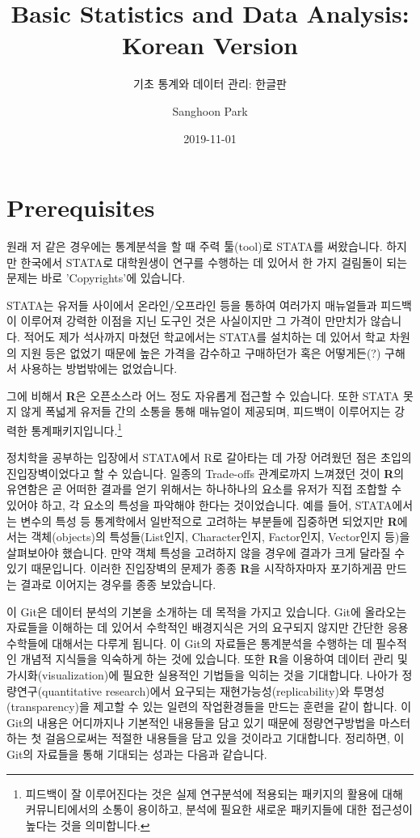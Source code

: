 \documentclass[]{book}
\title{Basic Statistics and Data Analysis: Korean Version}
\subtitle{기초 통계와 데이터 관리: 한글판}
\author{Sanghoon Park}
\date{2019-11-01}
\let\rmarkdownfootnote\footnote%
\def\footnote{\protect\rmarkdownfootnote}
\begin{document}
\maketitle

{
\hypersetup{linkcolor=black}
\setcounter{tocdepth}{1}
\tableofcontents
}
\hypertarget{prerequisites}{%
\chapter{Prerequisites}\label{prerequisites}}

원래 저 같은 경우에는 통계분석을 할 때 주력 툴(tool)로 STATA를 써왔습니다. 하지만 한국에서 STATA로 대학원생이 연구를 수행하는 데 있어서 한 가지 걸림돌이 되는 문제는 바로 'Copyrights'에 있습니다.

STATA는 유저들 사이에서 온라인/오프라인 등을 통하여 여러가지 매뉴얼들과 피드백이 이루어져 강력한 이점을 지닌 도구인 것은 사실이지만 그 가격이 만만치가 않습니다. 적어도 제가 석사까지 마쳤던 학교에서는 STATA를 설치하는 데 있어서 학교 차원의 지원 등은 없었기 때문에 높은 가격을 감수하고 구매하던가 혹은 어떻게든(?) 구해서 사용하는 방법밖에는 없었습니다.

그에 비해서 \textbf{R}은 오픈소스라 어느 정도 자유롭게 접근할 수 있습니다. 또한 STATA 못지 않게 폭넓게 유저들 간의 소통을 통해 매뉴얼이 제공되며, 피드백이 이루어지는 강력한 통계패키지입니다.\footnote{피드백이 잘 이루어진다는 것은 실제 연구분석에 적용되는 패키지의 활용에 대해 커뮤니티에서의 소통이 용이하고, 분석에 필요한 새로운 패키지들에 대한 접근성이 높다는 것을 의미합니다.}

정치학을 공부하는 입장에서 STATA에서 R로 갈아타는 데 가장 어려웠던 점은 초입의 진입장벽이었다고 할 수 있습니다. 일종의 Trade-offs 관계로까지 느껴졌던 것이 \textbf{R}의 유연함은 곧 어떠한 결과를 얻기 위해서는 하나하나의 요소를 유저가 직접 조합할 수 있어야 하고, 각 요소의 특성을 파악해야 한다는 것이었습니다. 예를 들어, STATA에서는 변수의 특성 등 통계학에서 일반적으로 고려하는 부분들에 집중하면 되었지만 \textbf{R}에서는 객체(objects)의 특성들(List인지, Character인지, Factor인지, Vector인지 등)을 살펴보아야 했습니다. 만약 객체 특성을 고려하지 않을 경우에 결과가 크게 달라질 수 있기 때문입니다. 이러한 진입장벽의 문제가 종종 \textbf{R}을 시작하자마자 포기하게끔 만드는 결과로 이어지는 경우를 종종 보았습니다.

이 Git은 데이터 분석의 기본을 소개하는 데 목적을 가지고 있습니다. Git에 올라오는 자료들을 이해하는 데 있어서 수학적인 배경지식은 거의 요구되지 않지만 간단한 응용수학들에 대해서는 다루게 됩니다. 이 Git의 자료들은 통계분석을 수행하는 데 필수적인 개념적 지식들을 익숙하게 하는 것에 있습니다. 또한 \textbf{R}을 이용하여 데이터 관리 및 가시화(visualization)에 필요한 실용적인 기법들을 익히는 것을 기대합니다. 나아가 정량연구(quantitative research)에서 요구되는 재현가능성(replicability)와 투명성(transparency)을 제고할 수 있는 일련의 작업환경들을 만드는 훈련을 같이 합니다. 이 Git의 내용은 어디까지나 기본적인 내용들을 담고 있기 때문에 정량연구방법을 마스터하는 첫 걸음으로써는 적절한 내용들을 담고 있을 것이라고 기대합니다. 정리하면, 이 Git의 자료들을 통해 기대되는 성과는 다음과 같습니다.
\end{document}
